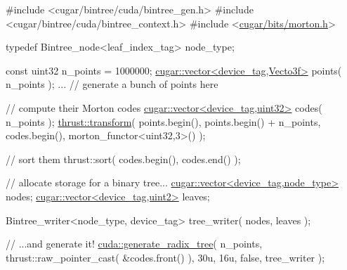 \begin{DoxyCode}
\textcolor{preprocessor}{#include <cugar/bintree/cuda/bintree\_gen.h>}
\textcolor{preprocessor}{#include <cugar/bintree/cuda/bintree\_context.h>}
\textcolor{preprocessor}{#include <\hyperlink{morton_8h}{cugar/bits/morton.h}>}

\textcolor{keyword}{typedef} Bintree\_node<leaf\_index\_tag> node\_type;

\textcolor{keyword}{const} uint32 n\_points = 1000000;
\hyperlink{structcugar_1_1vector}{cugar::vector<device\_tag,Vecto3f>} points( n\_points );
... \textcolor{comment}{// generate a bunch of points here}

\textcolor{comment}{// compute their Morton codes}
\hyperlink{structcugar_1_1vector}{cugar::vector<device\_tag,uint32>} codes( n\_points );
\hyperlink{group___primitives_gab584ee91ed39f9b1fec5aa0e7a0284a4}{thrust::transform}(
    points.begin(),
    points.begin() + n\_points,
    codes.begin(),
    morton\_functor<uint32,3>() );

\textcolor{comment}{// sort them}
thrust::sort( codes.begin(), codes.end() );

\textcolor{comment}{// allocate storage for a binary tree...}
\hyperlink{structcugar_1_1vector}{cugar::vector<device\_tag,node\_type>} nodes;
\hyperlink{structcugar_1_1vector}{cugar::vector<device\_tag,uint2>}     leaves;

Bintree\_writer<node\_type, device\_tag> tree\_writer( nodes, leaves );

\textcolor{comment}{// ...and generate it!}
\hyperlink{group__radixtree_gafb888a81f085548c89a282181d74649a}{cuda::generate\_radix\_tree}(
    n\_points,
    thrust::raw\_pointer\_cast( &codes.front() ),
    30u,
    16u,
    \textcolor{keyword}{false},
    tree\_writer );
\end{DoxyCode}
 \mbox{\label{group__radixtree_ga5993c99673b557cb58a86ec0fbb39e35}} 
